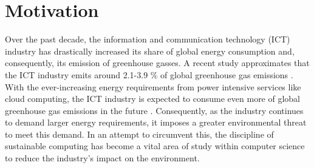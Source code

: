 \documentclass{l4proj}
\begin{document}




\section{Motivation}\label{intro:subsec:motivation}
Over the past decade, the information and communication technology (ICT) industry has drastically increased its share of global energy consumption and, consequently, its emission of greenhouse gasses.
A recent study approximates that the ICT industry emits around 2.1-3.9 \% of global greenhouse gas emissions \citep{current_energy_consumption}.
With the ever-increasing energy requirements from power intensive services like cloud computing, the ICT industry is expected to consume even more of global greenhouse gas emissions in the future \citep{co2Challenges}.
Consequently, as the industry continues to demand larger energy requirements, it imposes a greater environmental threat to meet this demand.
In an attempt to circumvent this, the discipline of sustainable computing has become a vital area of study within computer science to reduce the industry's impact on the environment.
\end{document}
